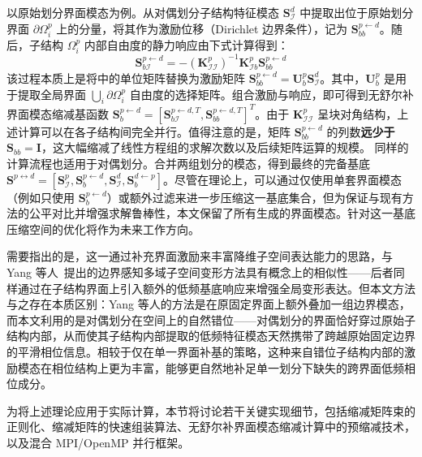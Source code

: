 以原始划分界面模态为例。从对偶划分子结构特征模态 $\mathbf{S}_{\mathcal{I}}^d$ 中提取出位于原始划分界面 $\partial \Omega_i^p$ 上的分量，将其作为激励位移（Dirichlet 边界条件），记为 $\mathbf{S}_{bb}^{p\leftarrow d}$。随后，子结构 $\Omega_i^p$ 内部自由度的静力响应由下式计算得到：
\begin{equation}
  \mathbf{S}_{b\mathcal{I}}^{p\leftarrow d} = -
  (\mathbf{K}_{\mathcal{I}\mathcal{I}}^p)^{-1} \mathbf{K}_{\mathcal{I}b}^p
  \mathbf{S}_{bb}^{p\leftarrow d}
  \label{eq:ours-response-solution}
\end{equation}
该过程本质上是将中的单位矩阵替换为激励矩阵 $\mathbf{S}_{bb}^{p \leftarrow d} = \mathbf{U}_b^p \mathbf{S}_{\mathcal{I}}^d$。其中，$\mathbf{U}_b^p$ 是用于提取全局界面 $\bigcup_i \partial \Omega_i^p$ 自由度的选择矩阵。组合激励与响应，即可得到无舒尔补界面模态缩减基函数 $\mathbf{S}_b^{p\leftarrow d}= [\mathbf{S}_{b\mathcal{I}}^{p\leftarrow d, T}, \mathbf{S}_{bb}^{p\leftarrow d,T}]^T$。由于 $\mathbf{K}^p_{\mathcal{II}}$ 呈块对角结构，上述计算可以在各子结构间完全并行。\textcolor{ExplainConclusion}{值得注意的是，矩阵 $\mathbf{S}_{bb}^{p \leftarrow d}$ 的列数\textbf{远少于} $\mathbf{S}_{bb}=\mathbf{I}$，这大幅缩减了线性方程组的求解次数以及后续矩阵运算的规模。} 同样的计算流程也适用于对偶划分。合并两组划分的模态，得到最终的完备基底 $\mathbf{S}^{p\leftrightarrow d}=[\mathbf{S}^p_{\mathcal{I}}, \mathbf{S}_{b}^{p\leftarrow d}, \mathbf{S}^d_{\mathcal{I}},\mathbf{S}_{b}^{d\leftarrow p} ]$。尽管在理论上，可以通过仅使用单套界面模态（例如只使用 $\mathbf{S}_{b}^{p\leftarrow d}$）或额外过滤来进一步压缩这一基底集合，但为保证与现有方法的公平对比并增强求解鲁棒性，本文保留了所有生成的界面模态。针对这一基底压缩空间的优化将作为未来工作方向。

需要指出的是，这一通过补充界面激励来丰富降维子空间表达能力的思路，与 Yang 等人~\cite{6461878}提出的边界感知多域子空间变形方法具有概念上的相似性——后者同样通过在子结构界面上引入额外的低频基底响应来增强全局变形表达。但本文方法与之存在本质区别：Yang 等人的方法是在原固定界面上额外叠加一组边界模态，而本文利用的是对偶划分在空间上的自然错位——对偶划分的界面恰好穿过原始子结构内部，从而使其子结构内部提取的低频特征模态天然携带了跨越原始固定边界的平滑相位信息。相较于仅在单一界面补基的策略，这种来自错位子结构内部的激励模态在相位结构上更为丰富，能够更自然地补足单一划分下缺失的跨界面低频相位成分。

为将上述理论应用于实际计算，本节将讨论若干关键实现细节，包括缩减矩阵束的正则化、缩减矩阵的快速组装算法、无舒尔补界面模态缩减计算中的预缩减技术，以及混合 MPI/OpenMP 并行框架。

